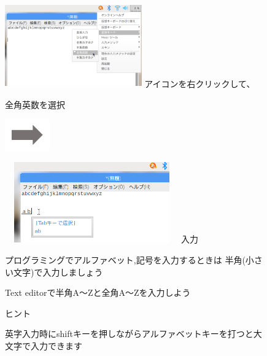 \documentclass[a4paper,12pt]{jarticle}
\begin{document}
\begin{figure}[ht]
  \begin{minipage}{7.173cm}
    \includegraphics[width=5.889cm,height=3.596cm]{textbook-img069.png}
     アイコンを右クリックして、

    全角英数を選択
  \end{minipage}
  \includegraphics[width=1.919cm,height=1.365cm]{textbook-img053.png}
  \begin{minipage}{7.178cm}
    \includegraphics[width=7.471cm,height=3.469cm]{textbook-img070.png}
     入力
  \end{minipage}

  \vspace{3mm}
  \begin{minipage}{16.578cm}
    {\centering\large
      プログラミングでアルファベット,記号を入力するときは
      半角(小さい文字)で入力しましょう
    }
  \end{minipage}

  \flushleft
  \theQuestion\label{Q:hasAnswer02-5}

  Text editorで半角A〜Zと全角A〜Zを入力しよう

  ヒント


  英字入力時にshiftキーを押しながらアルファベットキーを打つと大文字で入力できます
\end{figure}
\clearpage
\end{document}
